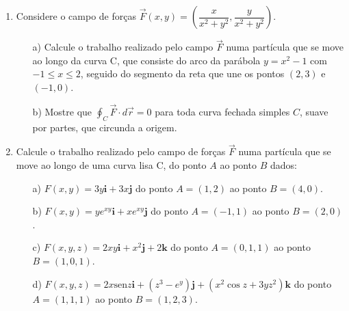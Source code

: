 \documentclass[a4paper,5pt]{amsbook}
\newcommand{\sen}{\text{sen}}
\numberwithin{equation}{chapter}
\begin{document}
 
\begin{enumerate}
\item Considere o campo de for\c{c}as $\overrightarrow{F}(x,y)=\left(\dfrac{x}{x^2+y^2}, \dfrac{y}{x^2+y^2}\right)$.\\
\begin{itemize}
 \item[a)]Calcule o trabalho realizado pelo campo $\overrightarrow{F}$ numa part\'icula que se move ao longo da curva C, que consiste do arco da par\'abola $y=x^2-1$ com $-1\leq x \leq 2$, seguido do segmento da reta que une os pontos $(2,3)$ e $(-1,0)$.\\
 \item[b)] Mostre que $ \displaystyle\oint_{C}\overrightarrow{F}\cdot d\overrightarrow{r} = 0$ para toda curva fechada simples $C$, suave por partes, que circunda a origem.\\
\end{itemize}

\item Calcule o trabalho realizado pelo campo de for\c{c}as $\overrightarrow{F}$ numa part\'icula que se move ao longo de uma curva lisa C, do ponto $A$ ao ponto $B$ dados:
\begin{itemize}
 \item[a)]$F(x,y)=3y\textbf{i}+3x\textbf{j}$ do ponto $A=(1,2)$ ao ponto $B=(4,0)$.\\
 \item[b)]$F(x,y)=ye^{xy}\textbf{i}+xe^{xy}\textbf{j}$ do ponto $A=(-1,1)$ ao ponto $B=(2,0)$.\\
 \item[c)]$F(x,y,z)=2xy\textbf{i}+x^2\textbf{j}+2\textbf{k}$ do ponto $A=(0,1,1)$ ao ponto $B=(1,0,1)$.\\
 \item[d)]$F(x,y,z)=2x\sen z\textbf{i}+(z^3-e^y)\textbf{j}+(x^2\cos z+3yz^2)\textbf{k}$ do ponto $A=(1,1,1)$ ao ponto $B=(1,2,3)$.\\
\end{itemize}


\end{enumerate}
\end{document}
